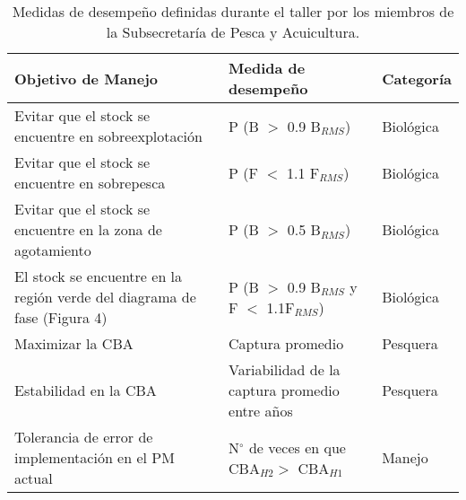 \begin{table}[h]
    \centering
    \caption{Medidas de desempeño definidas durante el taller por los miembros de la Subsecretaría de Pesca y Acuicultura.}
    \label{tab:tabla4}
    \begin{tabular}{|p{5.5cm}|p{6cm}|p{2cm}|}
        \hline
        \textbf{Objetivo de Manejo} & \textbf{Medida de desempeño} & \textbf{Categoría}  \\
        \hline
        Evitar que el stock se encuentre en sobreexplotación & P (B $>$ 0.9 B$_{RMS}$) & Biológica\\
        \hline
        Evitar que el stock se encuentre en sobrepesca & P (F $<$ 1.1 F$_{RMS}$) & Biológica \\
        \hline
        Evitar que el stock se encuentre en la zona de agotamiento  & P (B $>$ 0.5 B$_{RMS}$) & Biológica \\
        \hline
        El stock se encuentre en la región verde del diagrama de fase (Figura 4) & P (B $>$ 0.9 B$_{RMS}$ y F $<$ 1.1F$_{RMS}$) & Biológica \\
        \hline
        Maximizar la CBA & Captura promedio & Pesquera \\
        \hline
        Estabilidad en la CBA & Variabilidad de la captura promedio entre años & Pesquera\\
        \hline
        Tolerancia de error de implementación en el PM actual & N$^\circ$ de veces en que CBA$_{H2} >$ CBA$_{H1}$ & Manejo \\
        \hline
    \end{tabular}
\end{table}
